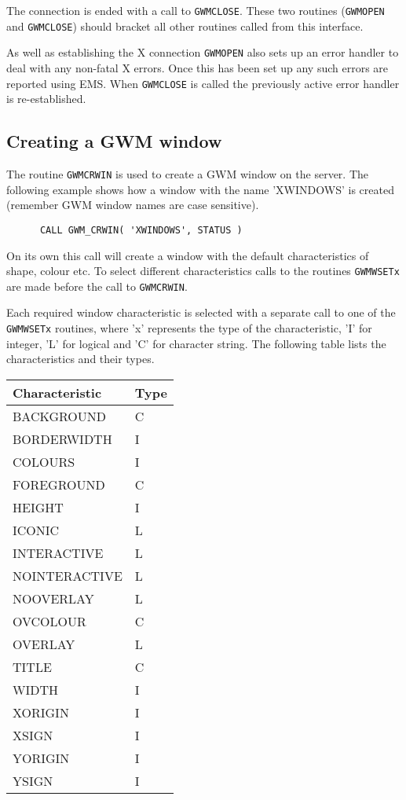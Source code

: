 \documentclass[twoside,11pt]{article}
\newcommand{\htmlref}[2]{#1}
\renewcommand{\_}{\texttt{\symbol{95}}}
\begin{document}
The connection is ended with a call to
\texttt{\htmlref{GWM\_CLOSE}{GWM_CLOSE}}.
These two routines
({\tt GWM\_OPEN} and {\tt GWM\_CLOSE}) should bracket all other routines
called from this interface.

As well as establishing the X connection {\tt GWM\_OPEN} also sets up
an error handler to deal with any non-fatal X errors. Once this has been
set up any such errors are reported using EMS. When {\tt GWM\_CLOSE} is
called the previously active error handler is re-established.

\subsection{Creating a GWM window}
The routine \texttt{\htmlref{GWM\_CRWIN}{GWM_CRWIN}}
is used to create a GWM window on the
server. The following example shows how a window with the name 'XWINDOWS'
is created (remember GWM window names are case sensitive).
\begin{verbatim}
      CALL GWM_CRWIN( 'XWINDOWS', STATUS )
\end{verbatim}
On its own this call will create a window with the default characteristics
of shape, colour etc. To select different characteristics calls to the
routines \texttt{\htmlref{GWM\_WSETx}{GWM_WSETC}} are made before
the call to {\tt GWM\_CRWIN}.

Each required window characteristic is selected with a separate call to
one of the {\tt GWM\_WSETx} routines, where 'x' represents the type of
the characteristic, 'I' for integer, 'L' for logical and 'C' for character
string. The following table lists the characteristics and their types.

\begin{center}
\begin{tabular}{|l|l|}   \hline
Characteristic & Type \\ \hline
BACKGROUND     & C    \\
BORDERWIDTH    & I    \\
COLOURS        & I    \\
FOREGROUND     & C    \\
HEIGHT         & I    \\
ICONIC         & L    \\
INTERACTIVE    & L    \\
NOINTERACTIVE  & L    \\
NOOVERLAY      & L    \\
OVCOLOUR       & C    \\
OVERLAY        & L    \\
TITLE          & C    \\
WIDTH          & I    \\
XORIGIN        & I    \\
XSIGN          & I    \\
YORIGIN        & I    \\
YSIGN          & I    \\ \hline
\end{tabular}
\end{center}
\end{document}
